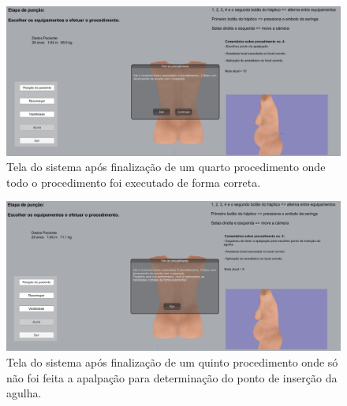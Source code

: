 \begin{figure}[ht!]
    \centering
    \includegraphics[width=\textwidth]{capitulos/figuras/sistema-exemplo-execucao-procedimento-4.png} 
    \caption{Tela do sistema após finalização de um quarto procedimento onde todo o procedimento foi executado de forma correta.}
    \label{fig:sistemaExecucao4correto}
\end{figure}

\begin{figure}[ht!]
    \centering
    \includegraphics[width=\textwidth]{capitulos/figuras/sistema-exemplo-execucao-procedimento-5.png} 
    \caption{Tela do sistema após finalização de um quinto procedimento onde só não foi feita a apalpação para determinação do ponto de inserção da agulha.}
    \label{fig:sistemaExecucao5semApalpacaoCorreto}
\end{figure}